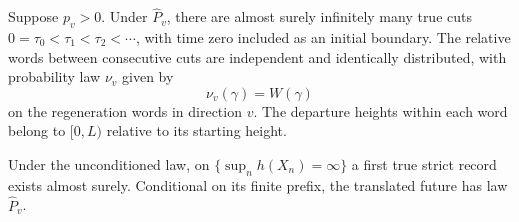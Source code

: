 \begin{lemma}\label{lem:slabs}
Suppose $p_v>0$.  Under $\widehat P_v$, there are almost surely infinitely
many true cuts
$0=\tau_0<\tau_1<\tau_2<\cdots$, with time zero included as an initial
boundary.  The relative words between consecutive cuts are independent
and identically distributed, with probability law $\nu_v$ given by
\[
 \nu_v(\gamma)=W(\gamma)
\]
on the regeneration words in direction $v$.  The departure heights within
each word belong to $[0,L)$ relative to its starting height.

Under the unconditioned law, on $\{\sup_n h(X_n)=\infty\}$ a first true
strict record exists almost surely.  Conditional on its finite prefix,
the translated future has law $\widehat P_v$.
\end{lemma}

